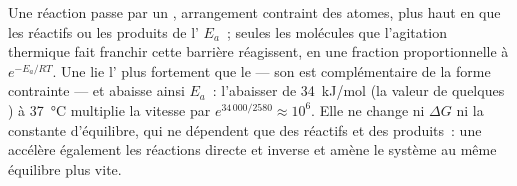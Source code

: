 \begin{proposition}\label{prop:b1:enzymes:whatitdoes}
Une réaction passe par un \emph{}, arrangement
contraint des atomes, plus haut en  que les réactifs ou les
produits de l'\emph{} $E_a$~; seules les molécules
que l'agitation thermique fait franchir cette barrière réagissent, en
une fraction proportionnelle à $e^{-E_a/RT}$. Une  lie l' plus fortement que le  --- son  est
complémentaire de la forme contrainte --- et abaisse ainsi $E_a$~:
l'abaisser de \qty{34}{kJ/mol} (la valeur de quelques ) à \qty{37}{\celsius} multiplie la vitesse par $e^{34\,000/2580} \approx
10^6$. Elle ne change ni $\Delta G$ ni la constante d'équilibre, qui ne
dépendent que des réactifs et des produits~: une  accélère
également les réactions directe et inverse et amène le système au même
équilibre plus vite.
\end{proposition}

